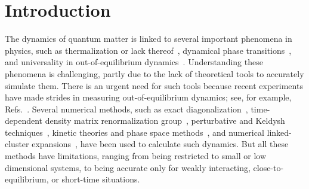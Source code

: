 \documentclass[pra,reprint,superscriptaddress]{revtex4-1}
\begin{document}
\section{Introduction}
The dynamics of quantum matter is linked to several important phenomena in physics, such as thermalization or lack thereof~\cite{nandkishore2015many}, dynamical phase transitions~\cite{eckstein2009thermalization, heyl2018dynamical}, and universality in out-of-equilibrium dynamics~\cite{prufer2018observation, langen:ultracold_2015, polkovnikov:nonequilibrium_2011, lamacraft-moore:potential-insights_2012, altman2015non, giamarchi2016strongly}. Understanding these phenomena is challenging, partly due to the lack of theoretical tools to accurately simulate them. There is an urgent need for such tools because recent experiments have made strides in measuring out-of-equilibrium dynamics; see, for example, Refs.~\cite{kim2010quantum, islam2013emergence, britton2012engineered, bohnet2016quantum, de2013nonequilibrium, de2016probing, zeiher2016many, mukherjee2016accessing, low2009universal, takei2016direct, guardado2017probing, nichols2018spin, lienhard2017observing, hazzard2014many, garttner2017measuring}.
Several numerical methods, such as exact diagonalization~\cite{manmana2005time, rigol2008thermalization, prelovvsek2013ground, sandvik2010computational}, time-dependent density matrix renormalization group~\cite{white2004real, daley2004time, vidal2004efficient, wolf2014solving, schuch2011classifying}, perturbative and Keldysh techniques~\cite{bray2002theory, calabrese2005ageing, henkel2008non, henkel2011non, kamenev2011field, tauber2014critical}, kinetic theories and phase space methods~\cite{walls2007quantum, blakie2008dynamics, gardiner2004quantum, orioli2017nonequilibrium}, and numerical linked-cluster expansions~\cite{tang2013short, rigol2014quantum, white2017quantum, guardado2017probing, nichols2018spin}, have been used to calculate such dynamics. But all these methods have limitations, ranging from being restricted to small or low dimensional systems, to being accurate only for weakly interacting, close-to-equilibrium, or short-time situations.
\end{document}
